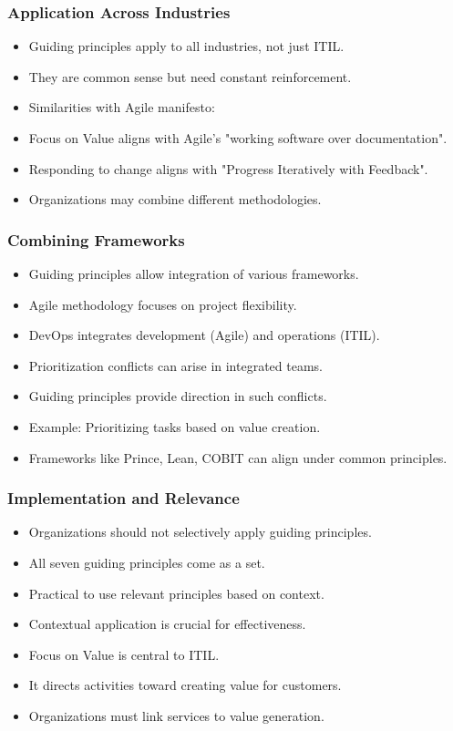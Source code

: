 \documentclass[aspectratio=169, table]{beamer}
\begin{document}
\begin{frame}
	\frametitle{Application Across Industries}
	\begin{itemize}
		\item Guiding principles apply to all industries, not just ITIL.
		\item They are common sense but need constant reinforcement.
		\item Similarities with Agile manifesto:
		\item Focus on Value aligns with Agile's "working software over documentation".
		\item Responding to change aligns with "Progress Iteratively with Feedback".
		\item Organizations may combine different methodologies.
	\end{itemize}
\end{frame}

\begin{frame}
	\frametitle{Combining Frameworks}
	\begin{itemize}
		\item Guiding principles allow integration of various frameworks.
		\item Agile methodology focuses on project flexibility.
		\item DevOps integrates development (Agile) and operations (ITIL).
		\item Prioritization conflicts can arise in integrated teams.
		\item Guiding principles provide direction in such conflicts.
		\item Example: Prioritizing tasks based on value creation.
		\item Frameworks like Prince, Lean, COBIT can align under common principles.
	\end{itemize}
\end{frame}

\begin{frame}
	\frametitle{Implementation and Relevance}
	\begin{itemize}
		\item Organizations should not selectively apply guiding principles.
		\item All seven guiding principles come as a set.
		\item Practical to use relevant principles based on context.
		\item Contextual application is crucial for effectiveness.
		\item Focus on Value is central to ITIL.
		\item It directs activities toward creating value for customers.
		\item Organizations must link services to value generation.
	\end{itemize}
\end{frame}
\end{document}
